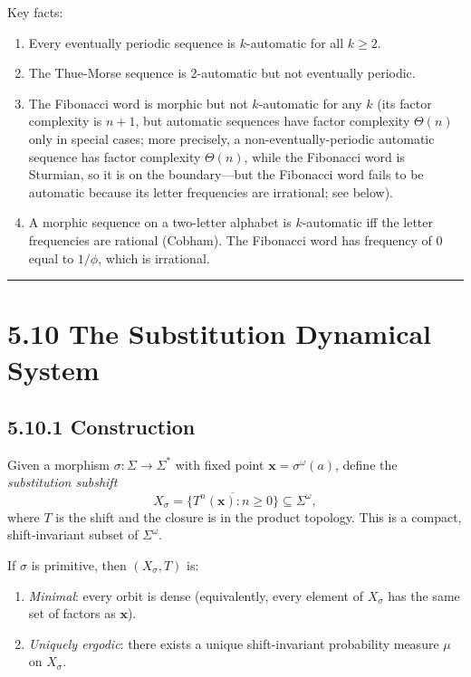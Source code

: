 Key facts:
\begin{enumerate}
  \item Every eventually periodic sequence is $k$-automatic for all $k \geq 2$.
  \item The Thue-Morse sequence is 2-automatic but not eventually periodic.
  \item The Fibonacci word is morphic but not $k$-automatic for any $k$ (its factor complexity is $n+1$, but automatic sequences have factor complexity $\Theta(n)$ only in special cases; more precisely, a non-eventually-periodic automatic sequence has factor complexity $\Theta(n)$, while the Fibonacci word is Sturmian, so it is on the boundary---but the Fibonacci word fails to be automatic because its letter frequencies are irrational; see below).
  \item A morphic sequence on a two-letter alphabet is $k$-automatic iff the letter frequencies are rational (Cobham). The Fibonacci word has frequency of $0$ equal to $1/\phi$, which is irrational.
\end{enumerate}

\bigskip\hrule\bigskip

\section{5.10 The Substitution Dynamical System}

\subsection{5.10.1 Construction}

Given a morphism $\sigma: \Sigma \to \Sigma^*$ with fixed point $\mathbf{x} = \sigma^\omega(a)$, define the \textit{substitution subshift}
\[
X_\sigma = \overline{\{ T^n(\mathbf{x}) : n \geq 0\} } \subseteq \Sigma^\omega,
\]
where $T$ is the shift and the closure is in the product topology. This is a compact, shift-invariant subset of $\Sigma^\omega$.

\begin{theorem}
If $\sigma$ is primitive, then $(X_\sigma, T)$ is:
\end{theorem}
\begin{enumerate}
  \item \textit{Minimal}: every orbit is dense (equivalently, every element of $X_\sigma$ has the same set of factors as $\mathbf{x}$).
  \item \textit{Uniquely ergodic}: there exists a unique shift-invariant probability measure $\mu$ on $X_\sigma$.
\end{enumerate}

